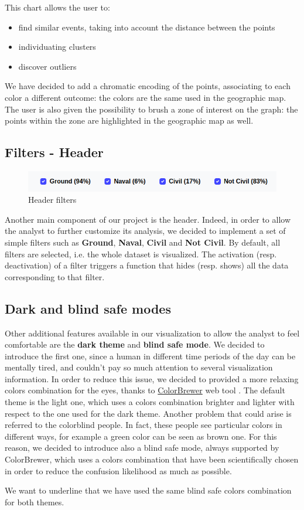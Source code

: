 This chart allows the user to:
\begin{itemize}
    \item find similar events, taking into account the distance between the points
    \item individuating clusters
    \item discover outliers
\end{itemize}

We have decided to add a chromatic encoding of the points, associating to each color a different outcome: the colors are the same used in the geographic map.
The user is also given the possibility to brush a zone of interest on the graph: the points within the zone are highlighted in the geographic map as well.

\subsection{Filters - Header}
\begin{figure}[h]
    \centering
    \includegraphics[scale=0.32]{./images/header_filters.png}
    \caption{Header filters}
\end{figure}
Another main component of our project is the header.
Indeed, in order to allow the analyst to further customize its analysis, we decided to implement a set of simple filters such as \textbf{Ground}, \textbf{Naval}, \textbf{Civil} and \textbf{Not Civil}.
By default, all filters are selected, i.e. the whole dataset is visualized.
The activation (resp. deactivation) of a filter triggers a function that hides (resp. shows) all the data corresponding to that filter.

\subsection{Dark and blind safe modes}
Other additional features available in our visualization to allow the analyst to feel comfortable are the \textbf{dark theme} and \textbf{blind safe mode}.
We decided to introduce the first one, since a human in different time periods of the day can be mentally tired, and couldn't pay so much attention to several visualization information.
In order to reduce this issue, we decided to provided a more relaxing colors combination for the eyes, thanks to \href{https://colorbrewer2.org/}{ColorBrewer} web tool \cite{HB03}.
The default theme is the light one, which uses a colors combination brighter and lighter with respect to the one used for the dark theme.
Another problem that could arise is referred to the colorblind people. In fact, these people see particular colors in different ways, for example a green color can be seen as brown one.
For this reason, we decided to introduce also a blind safe mode, always supported by ColorBrewer, which uses a colors combination that have been scientifically chosen in order to reduce the confusion likelihood as much as possible.

We want to underline that we have used the same blind safe colors combination for both themes.